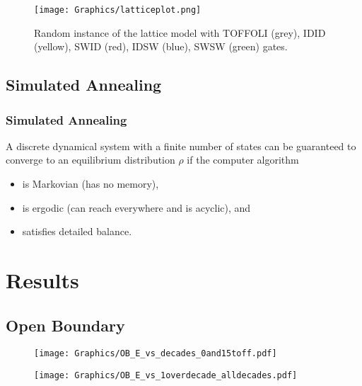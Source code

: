 \documentclass{beamer}
\begin{document}
\begin{frame}
  \begin{figure}
  \texttt{[image: Graphics/latticeplot.png]}
  \caption{Random instance of the lattice model with TOFFOLI (grey), IDID (yellow), SWID (red), IDSW (blue), SWSW (green) gates. \label{fig::latticeplot}}
  \end{figure}
\end{frame}

\subsection{Simulated Annealing}
\begin{frame}
  \frametitle{Simulated Annealing}
  \begin{theorem}\label{th:equilibrium}
    A discrete dynamical system with a finite number of states can be guaranteed to converge to an equilibrium distribution $\rho$ if the computer algorithm
    \begin{itemize}
      \item is Markovian (has no memory),
      \item is ergodic (can reach everywhere and is acyclic), and
      \item satisfies detailed balance.
    \end{itemize}
  \end{theorem}
\end{frame}

\section{Results}
\subsection{Open Boundary}
\begin{frame}
  \begin{figure}
    \texttt{[image: Graphics/OB\_E\_vs\_decades\_0and15toff.pdf]}
  \end{figure}
\end{frame}
\begin{frame}
  \begin{figure}
    \scalebox{0.55}{}
  \end{figure}
\end{frame}

\begin{frame}
  \begin{figure}
    \texttt{[image: Graphics/OB\_E\_vs\_1overdecade\_alldecades.pdf]}
  \end{figure}
\end{frame}
\end{document}
